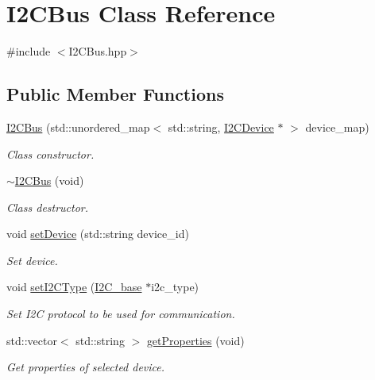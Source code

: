 \hypertarget{class_i2_c_bus}{}\section{I2\+C\+Bus Class Reference}
\label{class_i2_c_bus}


{\ttfamily \#include $<$I2\+C\+Bus.\+hpp$>$}

\subsection*{Public Member Functions}
\begin{DoxyCompactItemize}
\item 
\hyperlink{class_i2_c_bus_a53db5c5daff720905da00259e8ea5709}{I2\+C\+Bus} (std\+::unordered\+\_\+map$<$ std\+::string, \hyperlink{class_i2_c_device}{I2\+C\+Device} $\ast$ $>$ device\+\_\+map)
\begin{DoxyCompactList}\small\item\em Class constructor. \end{DoxyCompactList}\item 
\hyperlink{class_i2_c_bus_acdaf1b4ec82f6de308cc9604ce5e5e42}{$\sim$\+I2\+C\+Bus} (void)
\begin{DoxyCompactList}\small\item\em Class destructor. \end{DoxyCompactList}\item 
void \hyperlink{class_i2_c_bus_aeade1580d9ec9bba9a3b81f869b30243}{set\+Device} (std\+::string device\+\_\+id)
\begin{DoxyCompactList}\small\item\em Set device. \end{DoxyCompactList}\item 
void \hyperlink{class_i2_c_bus_a638333598e870191d42da15de6aeec0b}{set\+I2\+C\+Type} (\hyperlink{class_i2_c__base}{I2\+C\+\_\+base} $\ast$i2c\+\_\+type)
\begin{DoxyCompactList}\small\item\em Set I2C protocol to be used for communication. \end{DoxyCompactList}\item 
std\+::vector$<$ std\+::string $>$ \hyperlink{class_i2_c_bus_ab9cc5b3980240de9369ef6959881dd03}{get\+Properties} (void)
\begin{DoxyCompactList}\small\item\em Get properties of selected device. \end{DoxyCompactList}\item 

\end{DoxyCompactItemize}
